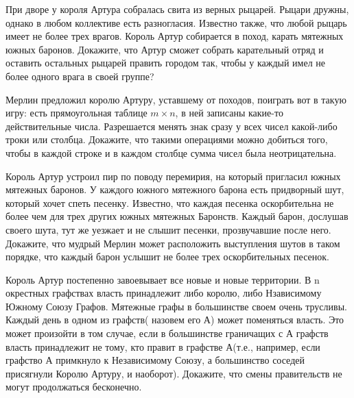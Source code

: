 \begin{problems}

\item При дворе у короля Артура собралась свита из верных рыцарей. Рыцари дружны, однако в любом коллективе есть разногласия. Известно также, что любой рыцарь имеет не более трех врагов.  Король Артур собирается в поход, карать мятежных южных баронов. Докажите, что Артур сможет собрать карательный отряд и оставить остальных рыцарей править городом так, чтобы у каждый имел не более одного врага в своей группе?


\item Мерлин предложил королю Артуру, уставшему от походов, поиграть вот в такую игру: есть прямоугольная таблице $ m \times n$,  в ней записаны какие-то действительные числа. Разрешается менять знак сразу у всех чисел какой-либо троки или столбца. Докажите, что такими операциями можно добиться того, чтобы в каждой строке и в каждом столбце сумма чисел была неотрицательна.

\item Король Артур устроил пир по поводу перемирия, на который пригласил южных мятежных баронов. У каждого южного мятежного барона есть придворный шут, который хочет спеть песенку. Известно, что каждая песенка оскорбительна не более чем для
трех других южных мятежных Баронств. Каждый барон, дослушав своего шута, тут же уезжает и не слышит песенки, прозвучавшие после него. Докажите, что мудрый Мерлин может расположить выступления шутов в таком порядке, что каждый барон услышит не более трех оскорбительных песенок.



\item Король Артур постепенно завоевывает все новые и новые территории. В n окрестных графствах власть принадлежит либо королю, либо Нзависимому Южному Союзу Графов. Мятежные графы в большинстве своем очень трусливы. Каждый день в одном из графств( назовем его А) может поменяться власть. Это может произойти в том случае, если в большинстве граничащих с А графств власть принадлежит не тому, кто правит в графстве А(т.е., например,  если графство А примкнуло к Независимому Союзу, а большинство соседей присягнули Королю Артуру, и наоборот). Докажите, что смены правительств не могут продолжаться бесконечно. 


\end{problems}
